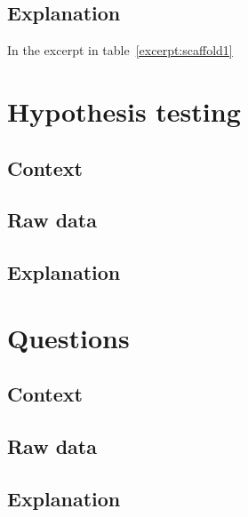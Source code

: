 \subsection{Explanation}
In the excerpt in table~\ref{excerpt:scaffold1} 
\section{Hypothesis testing}

\subsection{Context}
\subsection{Raw data}
\subsection{Explanation}

\section{Questions}

\subsection{Context}
\subsection{Raw data}
\subsection{Explanation}